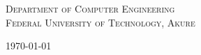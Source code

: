 \begin{titlepage}
\begin{center}
	\textsc{Department of Computer Engineering\\
		Federal University of Technology, Akure}
\end{center}

\vfill
\begin{center}
	{\today}
\end{center}


\end{titlepage}
